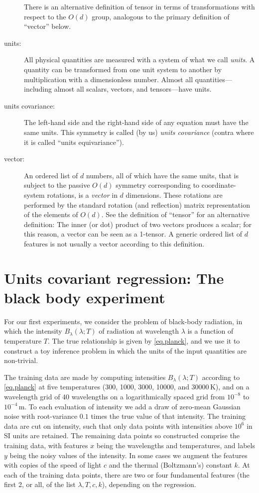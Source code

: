 \documentclass[accepted]{article}
\begin{document}
\begin{description}
  There is an alternative definition of tensor in terms of transformations with respect to the $O(d)$ group, analogous to the primary definition of ``vector'' below.
\item[units:]
  All physical quantities are measured with a system of what we call \emph{units}.
  A quantity can be transformed from one unit system to another by multiplication with a dimensionless number.
  Almost all quantities---including almost all scalars, vectors, and tensors---have units.
\item[units covariance:]
  The left-hand side and the right-hand side of any equation must have the same units.
  This symmetry is called (by us) \emph{units covariance} (contra \citealt{villar2022dimensionless} where it is called ``units equivariance'').
\item[vector:]
  An ordered list of $d$ numbers, all of which have the same units, that is subject to the passive $O(d)$ symmetry corresponding to coordinate-system rotations, is a \emph{vector} in $d$ dimensions.
  These rotations are performed by the standard rotation (and reflection) matrix representation of the elements of $O(d)$.
  See the definition of ``tensor'' for an alternative definition:
  The inner (or dot) product of two vectors produces a scalar; for this reason, a vector can be seen as a 1-tensor.
  A generic ordered list of $d$ features is not usually a vector according to this definition.
\end{description}

\section{Units covariant regression: The black body experiment}\label{app:dimensionless}
For our first experiments, we consider the problem of black-body radiation, in which the intensity $B_\lambda(\lambda ;T)$ of radiation at wavelength $\lambda$ is a function of temperature $T$.
The true relationship is given by \eqref{eq.planck}, and we use it to construct a toy inference problem in which the units of the input quantities are non-trivial.

The training data are made by computing intensities $B_\lambda(\lambda ;T)$ according to \eqref{eq.planck} at five temperatures (300, 1000, 3000, 10000, and 30000\,K), and on a wavelength grid of 40 wavelengths on a logarithmically spaced grid from $10^{-8}$ to $10^{-4}$\,m.
To each evaluation of intensity we add a draw of zero-mean Gaussian noise with root-variance $0.1$ times the true value of that intensity.
The training data are cut on intensity, such that only data points with intensities above $10^6$ in SI units are retained.
The remaining data points so constructed comprise the training data, with features $x$ being the wavelengths and temperatures, and labels $y$ being the noisy values of the intensity.
In some cases we augment the features with copies of the speed of light $c$ and the thermal (Boltzmann's) constant $k$.
At each of the training data points, there are two or four fundamental features (the first 2, or all, of the list $\lambda, T, c, k$), depending on the regression.
\end{document}
